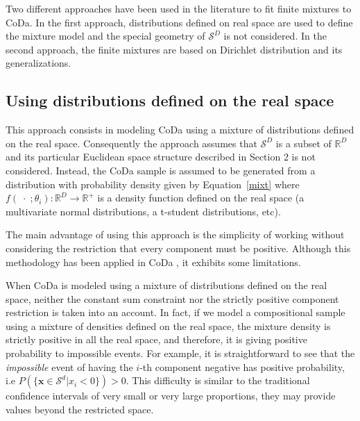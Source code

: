 \documentclass[10pt, a4paper]{article}
\begin{document}
\noindent Two different approaches have been used in the literature to fit finite mixtures to CoDa. 
In the first approach,  distributions defined on real space are used to define the mixture model and the special geometry of $\mathcal{S}^D$ is not considered. In the second approach,  the finite mixtures are based on Dirichlet distribution and its generalizations.


\subsection{Using distributions defined on the real space}
\label{real_section}

This approach consists in modeling CoDa using a mixture of distributions defined on the real space. Consequently the approach assumes that $\mathcal{S}^D$ is a subset of $\mathbb{R}^D$ and its particular Euclidean space structure described in Section 2 is not considered. Instead, the CoDa sample is assumed to be generated from a distribution with probability density given by Equation~\ref{mixt} where $f(\;\cdot\;;\theta_i): \mathbb{R}^D \rightarrow \mathbb{R}^+$ is a density function defined on the real space (a multivariate normal distributions, a  t-student distributions, etc).

The main advantage of using this approach is the simplicity of working without considering the restriction that every component must be positive.
Although this methodology has been applied in CoDa \citep[see][]{papageorgiou2001model}, it exhibits some limitations.


When CoDa is modeled using a mixture of distributions defined on the real space, neither the constant sum constraint nor the strictly positive component restriction is taken into an account. In fact, if we model a compositional sample using a mixture of densities defined on the real space, the mixture density is strictly positive in all the real space, and therefore, it is giving positive probability to impossible events. For example, it is straightforward to see that the \emph{impossible} event  of having the $i$-th component negative has positive probability, i.e $P(\{ \textbf{x} \in \mathcal{S}^d | x_i < 0 \}) > 0$. This difficulty is similar to the traditional confidence intervals of very small or very large proportions, they may provide values beyond the restricted space. 
\end{document}
